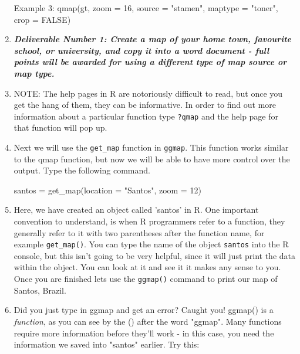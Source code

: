 \documentclass{article}
\newenvironment{Schunk}{}{}
\newcommand{\code}[1]{\texttt{#1}}
\newcommand{\pkg}[1]{\mbox{\texttt{#1}}}
\newcommand{\proglang}[1]{\textsf{#1}}
\begin{document}
\begin{enumerate}[leftmargin=15mm]
\begin{Schunk}
\begin{Sinput}
Example 3: qmap(gt, zoom = 16, source = "stamen", 
maptype = "toner", crop = FALSE)

\end{Sinput}
\end{Schunk}

\item \textbf{\textit{Deliverable Number 1:  Create a map of your home town, favourite school, or university, and copy it into a word document - full points will be awarded for using a different type of map source or map type.}}

\item NOTE: The help pages in \proglang{R} are notoriously difficult to read, but once you get the hang of them, they can be informative.  In order to find out more information about a particular function type \code{?qmap} and the help page for that function will pop up.


\item Next we will use the \code{get\_map} function in \pkg{ggmap}.  This function works similar to the qmap function, but now we will be able to have more control over the output.  Type the following command.

\begin{Schunk}
\begin{Sinput}

santos = get_map(location = "Santos", zoom = 12)

\end{Sinput}
\end{Schunk}

\item Here, we have created an object called 'santos' in \proglang{R}.  One important convention to understand, is when \proglang{R} programmers refer to a function, they generally refer to it with two parentheses after the function name, for example \code{get\_map()}.  You can type the name of the object \code{santos} into the \proglang{R} console, but this isn't going to be very helpful, since it will just print the data within the object.  You can look at it and see it it makes any sense to you.  Once you are finished lets use the \code{ggmap()} command to print our map of Santos, Brazil.

\item Did you just type in ggmap and get an error?  Caught you!  ggmap() is a \textit{function}, as you can see by the () after the word "ggmap".  Many functions require more information before they'll work - in this case, you need the information we saved into "santos" earlier.  Try this:


\end{enumerate}
\end{document}
